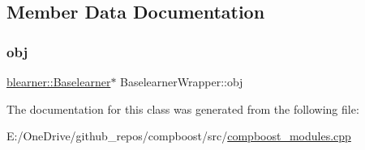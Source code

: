 \subsection{Member Data Documentation}
\mbox{\label{class_baselearner_wrapper_a4c0fc84b4a0d10d9353a263fbec92d22}} 
\subsubsection{\texorpdfstring{obj}{obj}}
{\footnotesize\ttfamily \mbox{\hyperlink{classblearner_1_1_baselearner}{blearner\+::\+Baselearner}}$\ast$ Baselearner\+Wrapper\+::obj\hspace{0.3cm}{\ttfamily [protected]}}



The documentation for this class was generated from the following file\+:\begin{DoxyCompactItemize}
\item 
E\+:/\+One\+Drive/github\+\_\+repos/compboost/src/\mbox{\hyperlink{compboost__modules_8cpp}{compboost\+\_\+modules.\+cpp}}\end{DoxyCompactItemize}
